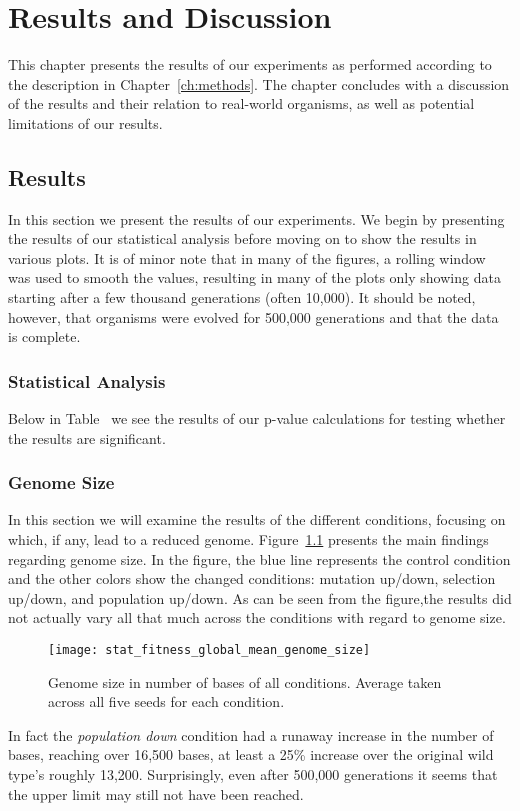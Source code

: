 \chapter{Results and Discussion}\label{ch:results_discussion}
This chapter presents the results of our experiments as performed according to the description in Chapter~\ref{ch:methods}. The chapter concludes with a discussion of the results and their relation to real-world organisms, as well as potential limitations of our results.

\section{Results}\label{results}
In this section we present the results of our experiments. We begin by presenting the results of our statistical analysis before moving on to show the results in various plots. It is of minor note that in many of the figures, a rolling window was used to smooth the values, resulting in many of the plots only showing data starting after a few thousand generations (often 10,000). It should be noted, however, that organisms were evolved for 500,000 generations and that the data is complete. 

\subsection{Statistical Analysis}
Below in Table~ we see the results of our p-value calculations for testing whether the results are significant.   

\subsection{Genome Size}\label{sec:genome_size}
In this section we will examine the results of the different conditions, focusing on which, if any, lead to a reduced genome. Figure~\ref{fig:genome_size}
presents the main findings regarding genome size. In the figure, the blue line represents the control condition and the other colors show the changed conditions: mutation up/down, selection up/down, and population up/down. As can be seen from the figure,the results did not actually vary all that much across the conditions with regard to genome size.  
\begin{figure}[H]
	\texttt{[image: stat\_fitness\_global\_mean\_genome\_size]}
	\centering
	\caption[Genome size]{Genome size in number of bases of all conditions. Average taken across all five seeds for each condition.}
	\label{fig:genome_size}
\end{figure}
In fact the \textit{population down} condition had a runaway increase in the number of bases, reaching over 16,500 bases, at least a 25\% increase over the original wild type's roughly 13,200. Surprisingly, even after 500,000 generations it seems that the upper limit may still not have been reached. 


